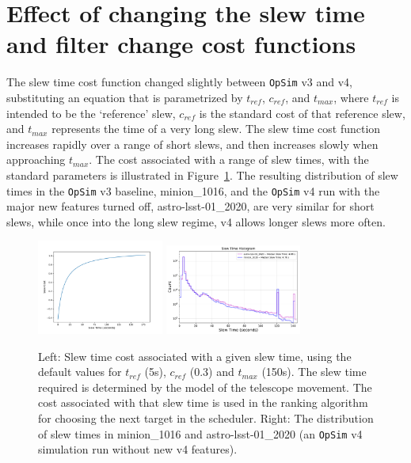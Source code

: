 \documentclass[DM,lsstdraft,authoryear,toc]{lsstdoc}
\newcommand{\opsim}{\texttt{OpSim}\xspace}
\begin{document}
\section{Effect of changing the slew time and filter change cost functions}

The slew time cost function changed slightly between \opsim v3 and v4, substituting an equation that is parametrized by $t_{ref}$, $c_{ref}$, and $t_{max}$, where $t_{ref}$ is intended to be the `reference' slew, $c_{ref}$ is the standard cost of that reference slew, and $t_{max}$ represents the time of a very long slew. The slew time cost function increases rapidly over a range of short slews, and then increases slowly when approaching $t_{max}$.  The cost associated with a range of slew times, with the standard parameters is illustrated in Figure~\ref{fig:slewcost}.  The resulting distribution of slew times in the \opsim v3 baseline, minion\_1016, and the \opsim v4 run with the major new features turned off, astro-lsst-01\_2020, are very similar for short slews, while once into the long slew regime, v4 allows longer slews more often.

\begin{figure}[ht]
\centering
\includegraphics[width=0.37\textwidth]{figures/slewcost}
\includegraphics[width=0.4\textwidth]{figures/slewtimes}
\caption{Left: Slew time cost associated with a given slew time, using the default values for $t_{ref}$ (5s), $c_{ref}$ (0.3) and $t_{max}$ (150s). The slew time required is determined by the model of the telescope movement. The cost associated with that slew time is used in the ranking algorithm for choosing the next target in the scheduler. Right: The distribution of slew times in minion\_1016 and astro-lsst-01\_2020 (an \opsim v4 simulation run without new v4 features). 
\label{fig:slewcost}}
\end{figure}
\end{document}
